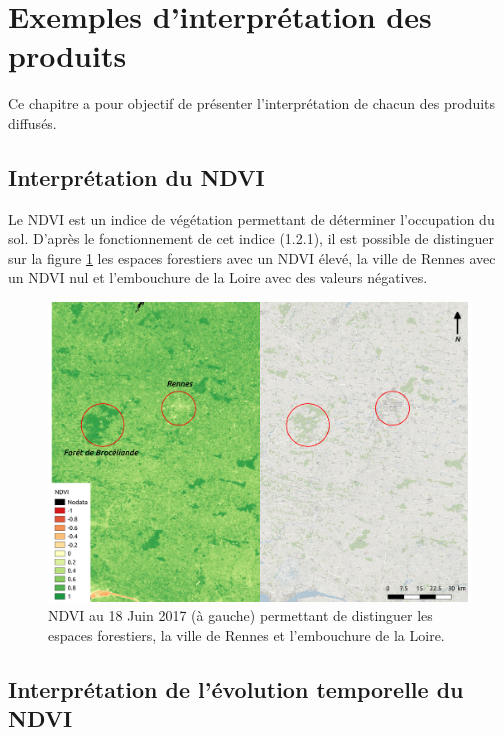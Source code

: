 \documentclass[10pt,a4paper]{article}
\begin{document}
\section{Exemples d'interprétation des produits}

Ce chapitre a pour objectif de présenter l'interprétation de chacun des produits diffusés.

\subsection{Interprétation du NDVI}

Le NDVI est un indice de végétation permettant de déterminer l'occupation du sol. D'après le fonctionnement de cet indice (1.2.1), il est possible de distinguer sur la figure \ref{NDVI1} les espaces forestiers avec un NDVI élevé, la ville de Rennes avec un NDVI nul et l'embouchure de la Loire avec des valeurs négatives.

\begin{figure}[!h]
\centering
\includegraphics[scale=0.33]{img/NDVI_interpretation1.pdf}
\caption{NDVI au 18 Juin 2017 (à gauche) permettant de distinguer les espaces forestiers, la ville de Rennes et l'embouchure de la Loire.}
\label{NDVI1}
\end{figure}

\subsection{Interprétation de l'évolution temporelle du NDVI}
\end{document}
